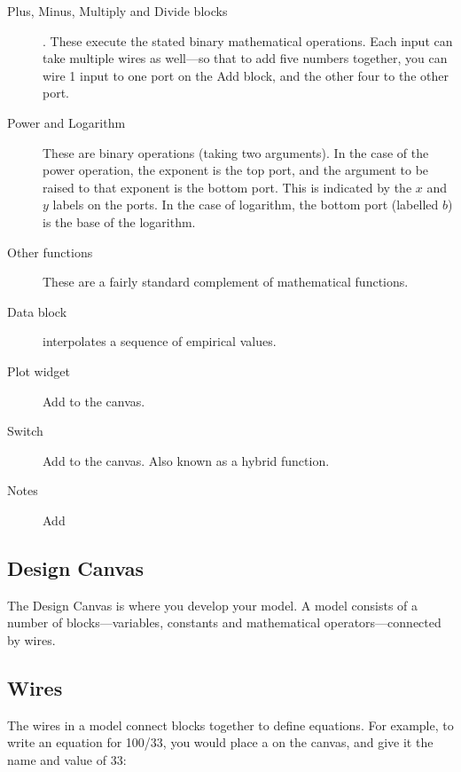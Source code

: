 \begin{description}
\item[Plus, Minus, Multiply and Divide blocks]
    . These execute the stated binary
    mathematical operations. Each input can take multiple wires as
    well---so that to add five numbers together, you can wire 1 input
    to one port on the Add block, and the other four to the other
    port. 


\item[Power and Logarithm] These are binary operations (taking two
arguments). In the case of the power operation, the exponent is the
top port, and the argument to be raised to that exponent is the bottom
port. This is indicated by the $x$ and $y$ labels on the ports. In the
case of logarithm, the bottom port (labelled $b$) is the base of the
logarithm.  

\item[Other functions] These are a fairly standard
complement of mathematical functions.  

\item[Data block]  interpolates a
sequence of empirical values.

\item[Plot widget] Add  to the canvas.

\item[Switch] Add  
to the canvas. Also known as a hybrid function.

\item[Notes] Add 

\end{description}

\subsection{Design Canvas}
\label{DesignCanvas}

The Design Canvas is where you develop your model. A model consists of
a number of blocks---variables, constants and mathematical
operators---connected by wires. 


\subsection{Wires}
\label{Wires}

The wires in a model connect blocks together to define equations. For
example, to write an equation for 100/33, you would place a
 on the canvas, and give it the name and value of 33:

